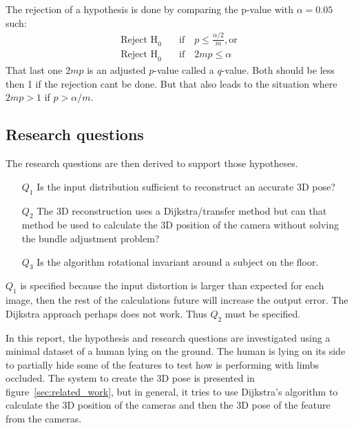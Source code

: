 The rejection of a hypothesis is done by comparing the p-value with $\alpha=0.05$ such:
\begin{align*}
    \text{Reject H}_0 & \quad\text{if}\quad p \leq \frac{\alpha /2}{m}, \text{or}\\
    \text{Reject H}_0 & \quad\text{if}\quad 2mp \leq \alpha
\end{align*}
That last one $2mp$ is an adjusted $p$-value called a $q$-value.
Both should be less then 1 if the rejection cant be done.
But that also leads to the situation where $2mp > 1$ if $p>\alpha/m$.

\subsection{Research questions}%
\label{sub:method:research_questions}
The research questions are then derived to support those hypotheses.
\begin{itemize}
    \item[$Q_1$] Is the input distribution sufficient to reconstruct an accurate 3D pose?
    \item[$Q_2$] The 3D reconstruction uses a Dijkstra/transfer method but can that method be used to calculate the 3D position of the camera without solving the bundle adjustment problem?
    \item[$Q_3$] Is the \openpose algorithm rotational invariant around a subject on the floor.
\end{itemize}
$Q_1$ is specified because the input distortion is larger than expected for each image, then the rest of the calculations future will increase the output error.
The Dijkstra approach perhaps does not work. Thus $Q_2$ must be specified.

In this report, the hypothesis and research questions are investigated using a minimal dataset of a human lying on the ground.
The human is lying on its side to partially hide some of the features to test how \openpose is performing with limbs occluded.
The system to create the 3D pose is presented in figure~\ref{sec:related_work}, but in general, it tries to use Dijkstra's algorithm to calculate the 3D position of the cameras and then the 3D pose of the feature from the cameras.





